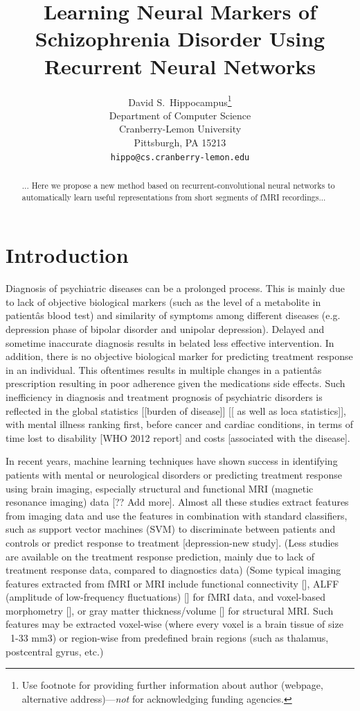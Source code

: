 \documentclass{article}
\title{Learning Neural Markers of Schizophrenia Disorder Using Recurrent Neural Networks}
\author{
  David S.~Hippocampus\thanks{Use footnote for providing further
    information about author (webpage, alternative
    address)---\emph{not} for acknowledging funding agencies.} \\
  Department of Computer Science\\
  Cranberry-Lemon University\\
  Pittsburgh, PA 15213 \\
  \texttt{hippo@cs.cranberry-lemon.edu} \\
}
\begin{document}

\maketitle

\begin{abstract}
... Here we propose a new method based on recurrent-convolutional neural networks to automatically learn useful representations from short segments of fMRI recordings...
\end{abstract}

\section{Introduction}
Diagnosis of psychiatric diseases can be a prolonged process. This is mainly due to lack of objective biological markers (such as the level of a metabolite in patientâs blood test) and similarity of symptoms among different diseases (e.g. depression phase of bipolar disorder and unipolar depression). Delayed and sometime inaccurate diagnosis results in belated less effective intervention. In addition, there is no objective biological marker for predicting treatment response in an individual. This oftentimes results in multiple changes in a patientâs prescription resulting in poor adherence given the medications side effects. Such inefficiency in diagnosis and treatment prognosis of psychiatric disorders is reflected in the global statistics [[burden of disease]] [[ as well as loca statistics]], with mental illness ranking first, before cancer and cardiac conditions, in terms of time lost to disability [WHO 2012 report] and costs \citep{Roehrig2016} [associated with the disease].

In recent years, machine learning techniques have shown success in identifying patients with mental or neurological disorders or predicting treatment response using brain imaging, especially structural and functional MRI (magnetic resonance imaging) data \citep{Gheiratmand2017, Orru2012} [?? Add more]. Almost all these studies extract features from imaging data and use the features in combination with standard classifiers, such as support vector machines (SVM) \citep{Orru2012, Wolfers2015} to discriminate between patients and controls or predict response to treatment [depression-new study]. (Less studies are available on the treatment response prediction, mainly due to lack of treatment response data, compared to diagnostics data) (Some typical imaging features extracted from fMRI or MRI include functional connectivity [], ALFF (amplitude of low-frequency fluctuations) [] for fMRI data, and voxel-based morphometry [], or gray matter thickness/volume [] for structural MRI. Such features may be extracted voxel-wise (where every voxel is a brain tissue of size ~1-33 mm3) or region-wise from predefined brain regions (such as thalamus, postcentral gyrus, etc.)
\end{document}
